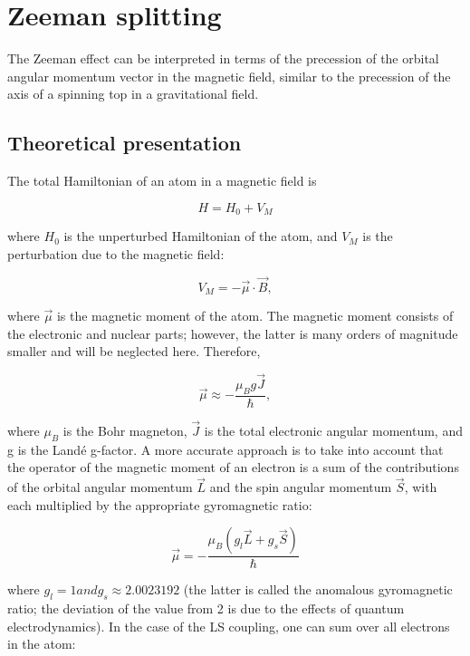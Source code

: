 \documentclass[main.tex]{subfiles}
\newcommand{\mblock}[1]{ {\allowbreak $#1$ }}
\begin{document}
\section{Zeeman splitting}

The Zeeman effect can be interpreted in terms of the precession of the orbital angular momentum vector in the magnetic field, similar to the precession of the axis of a spinning top in a gravitational field. 

\subsection{Theoretical presentation}

The total Hamiltonian of an atom in a magnetic field is

\begin{equation*}
H = H_0 + V_M
\end{equation*} 

where $H_0$ is the unperturbed Hamiltonian of the atom, and $V_M$ is the perturbation due to the magnetic field:

\begin{equation*}
V_M = -\vec{\mu} \cdot \vec{B},
\end{equation*}

where $\vec{\mu}$ is the magnetic moment of the atom. The magnetic moment consists of the electronic and nuclear parts; however, the latter is many orders of magnitude smaller and will be neglected here. Therefore,

\begin{equation*}
\vec{\mu} \approx -\frac{\mu_B g \vec{J}}{\hbar},
\end{equation*}

where $\mu_B$ is the Bohr magneton, $\vec{J}$ is the total electronic angular momentum, and g is the Land\'e g-factor. A more accurate approach is to take into account that the operator of the magnetic moment of an electron is a sum of the contributions of the orbital angular momentum $\vec{L}$ and the spin angular momentum $\vec{S}$, with each multiplied by the appropriate gyromagnetic ratio:

\begin{equation*}
\vec{\mu} = -\frac{\mu_B (g_l \vec{L} + g_s \vec{S})}{\hbar}
\end{equation*}

where \mblock{g_l = 1 and g_s \approx 2.0023192} (the latter is called the anomalous gyromagnetic ratio; the deviation of the value from 2 is due to the effects of quantum electrodynamics). In the case of the LS coupling, one can sum over all electrons in the atom:
\end{document}
